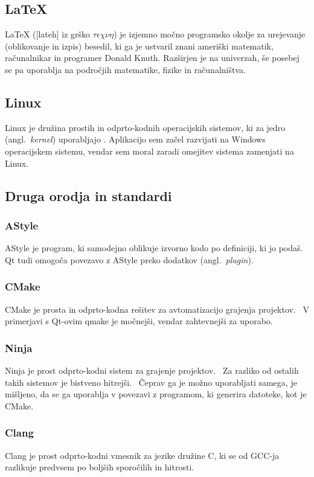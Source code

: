 \documentclass[12pt]{report}
\newcommand{\anglimp}[1]{angl.~\emph{#1}}
\newcommand{\angl}[1]{(\anglimp{#1})}
\newcommand{\codequote}[1]{\textquote{\texttt{#1}}}
\begin{document}
		\subsection{\LaTeX}
			\LaTeX{} ([lateh] iz grško $\tau\epsilon\chi\nu\eta$) je izjemno močno programsko okolje za urejevanje (oblikovanje in izpis) besedil, ki ga je ustvaril znani ameriški matematik, računalnikar in programer Donald Knuth.
			Razširjen je na univerzah, še posebej se pa uporablja na področjih matematike, fizike in računalništva.
		\subsection{Linux}
			Linux je družina prostih in odprto-kodnih operacijskih sistemov, ki za jedro \angl{kernel} uporabljajo .
			Aplikacijo sem začel razvijati na Windows operacijskem sistemu, vendar sem moral zaradi omejitev sistema zamenjati na Linux. %
		\subsection{Druga orodja in standardi}
			\subsubsection{AStyle}
				AStyle je program, ki samodejno oblikuje izvorno kodo po definiciji, ki jo podaš.~\cite{astyle}
				Qt tudi omogoča povezavo z AStyle preko dodatkov \angl{plugin}.
			\subsubsection{CMake}
				CMake je prosta in odprto-kodna rešitev za avtomatizacijo grajenja projektov.~\cite{cmake}
				V primerjavi s Qt-ovim qmake je močnejši, vendar zahtevnejši za uporabo.
			\subsubsection{Ninja}
				Ninja je prost odprto-kodni sistem za grajenje projektov.~\cite{ninja}
				Za razliko od ostalih takih sistemov je bistveno hitrejši.~\cite{ninja}
				Čeprav ga je možno uporabljati samega, je mišljeno, da se ga uporablja v povezavi z programom, ki generira \codequote{.ninja} datoteke, kot je CMake.~\cite{ninja}
			\subsubsection{Clang}
				Clang je prost odprto-kodni vmesnik za jezike družine C, ki se od GCC-ja razlikuje predvsem po boljših sporočilih in hitrosti.~\cite{clang}
\end{document}
